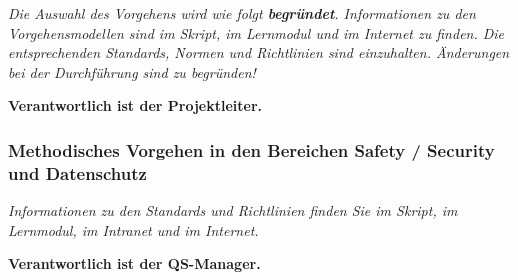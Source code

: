 \textit{Die Auswahl des Vorgehens wird wie folgt \textbf{begründet}.
Informationen zu den Vorgehensmodellen sind im Skript, im Lernmodul und im Internet zu finden.
Die entsprechenden Standards, Normen und Richtlinien sind einzuhalten.
Änderungen bei der Durchführung sind zu begründen!}

\textbf{Verantwortlich ist der Projektleiter.}

\subsubsection{Methodisches Vorgehen in den Bereichen Safety / Security und Datenschutz}
\textit{Informationen zu den Standards und Richtlinien finden Sie im Skript, im Lernmodul, im Intranet und im Internet.}

\textbf{Verantwortlich ist der QS-Manager.}
